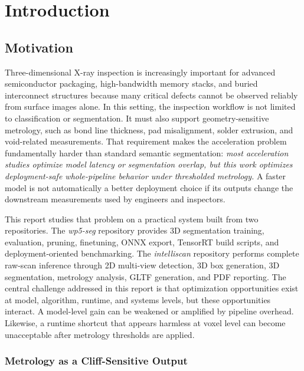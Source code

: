 \hypertarget{introduction}{%
\chapter{Introduction}\label{introduction}}

\hypertarget{motivation}{%
\section{Motivation}\label{motivation}}

Three-dimensional X-ray inspection is increasingly important for
advanced semiconductor packaging, high-bandwidth memory stacks, and
buried interconnect structures because many critical defects cannot be
observed reliably from surface images alone. In this setting, the
inspection workflow is not limited to classification or segmentation. It
must also support geometry-sensitive metrology, such as bond line
thickness, pad misalignment, solder extrusion, and void-related
measurements. That requirement makes the acceleration problem fundamentally harder
than standard semantic segmentation: \emph{most acceleration studies
optimize model latency or segmentation overlap, but this work optimizes
deployment-safe whole-pipeline behavior under thresholded metrology.}
A faster model is not automatically a better deployment choice if its
outputs change the downstream measurements used by engineers and
inspectors.

This report studies that problem on a practical system built from two
repositories. The \emph{wp5-seg} repository provides 3D segmentation
training, evaluation, pruning, finetuning, ONNX export, TensorRT build
scripts, and deployment-oriented benchmarking. The \emph{intelliscan}
repository performs complete raw-scan inference through 2D multi-view
detection, 3D box generation, 3D segmentation, metrology analysis, GLTF
generation, and PDF reporting. The central challenge addressed in this
report is that optimization opportunities exist at model, algorithm,
runtime, and systems levels, but these opportunities interact. A
model-level gain can be weakened or amplified by pipeline overhead.
Likewise, a runtime shortcut that appears harmless at voxel level can
become unacceptable after metrology thresholds are applied.

\hypertarget{metrology-as-a-cliff-sensitive-output}{%
\subsection{Metrology as a Cliff-Sensitive
Output}\label{metrology-as-a-cliff-sensitive-output}}


